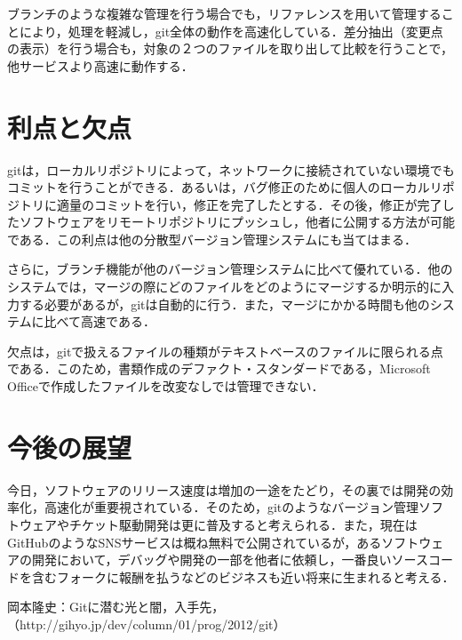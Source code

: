 \documentclass[a4j,9pt,twocolumn]{jsarticle}
\begin{document}
ブランチのような複雑な管理を行う場合でも，リファレンスを用いて管理することにより，処理を軽減し，git全体の動作を高速化している．差分抽出（変更点の表示）を行う場合も，対象の２つのファイルを取り出して比較を行うことで，他サービスより高速に動作する．

\section{利点と欠点}
gitは，ローカルリポジトリによって，ネットワークに接続されていない環境でもコミットを行うことができる．あるいは，バグ修正のために個人のローカルリポジトリに適量のコミットを行い，修正を完了したとする．その後，修正が完了したソフトウェアをリモートリポジトリにプッシュし，他者に公開する方法が可能である．この利点は他の分散型バージョン管理システムにも当てはまる．

さらに，ブランチ機能が他のバージョン管理システムに比べて優れている．他のシステムでは，マージの際にどのファイルをどのようにマージするか明示的に入力する必要があるが，gitは自動的に行う．また，マージにかかる時間も他のシステムに比べて高速である．

欠点は，gitで扱えるファイルの種類がテキストベースのファイルに限られる点である．このため，書類作成のデファクト・スタンダードである，Microsoft Officeで作成したファイルを改変なしでは管理できない．

\section{今後の展望}
今日，ソフトウェアのリリース速度は増加の一途をたどり，その裏では開発の効率化，高速化が重要視されている．そのため，gitのようなバージョン管理ソフトウェアやチケット駆動開発は更に普及すると考えられる．また，現在はGitHubのようなSNSサービスは概ね無料で公開されているが，あるソフトウェアの開発において，デバッグや開発の一部を他者に依頼し，一番良いソースコードを含むフォークに報酬を払うなどのビジネスも近い将来に生まれると考える．

\small
\begin{thebibliography}{99}
岡本隆史：Gitに潜む光と闇，入手先，（http://gihyo.jp/dev/column/01/prog/2012/git）

\end{thebibliography}
\end{document}
